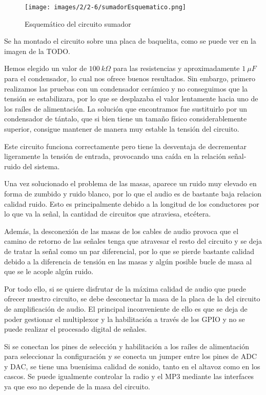 \begin{figure}[h]
    \centering
    \texttt{[image: images/2/2-6/sumadorEsquematico.png]}
    \caption{Esquemático del circuito sumador}
    \label{fig:2-6-sumador}
\end{figure}

Se ha montado el circuito sobre una placa de baquelita, como se puede ver en la imagen de la TODO.\ 


Hemos elegido un valor de $100\ k\Omega$ para las resistencias y aproximadamente $1\ \mu F$ para el condensador, lo cual nos ofrece buenos resultados. Sin embargo, primero realizamos las pruebas con un condensador cerámico y no conseguimos que la tensión se estabilizara, por lo que se desplazaba el valor lentamente hacia uno de los raíles de alimentación. La solución que encontramos fue sustituirlo por un condensador de tántalo, que si bien tiene un tamaño físico considerablemente superior, consigue mantener de manera muy estable la tensión del circuito.

Este circuito funciona correctamente pero tiene la desventaja de decrementar ligeramente la tensión de entrada, provocando una caída en la relación señal-ruido del sistema.

Una vez solucionado el problema de las masas, aparece un ruido muy elevado en forma de zumbido y ruido blanco, por lo que el audio es de bastante baja relacion calidad ruido. Esto es principalmente debido a la longitud de los conductores por lo que va la señal, la cantidad de circuitos que atraviesa, etcétera. 

Además, la desconexión de las masas de los cables de audio provoca que el camino de retorno de las señales tenga que atravesar el resto del circuito y se deja de tratar la señal como un par diferencial, por lo que se pierde bastante calidad debido a la diferencia de tensión en las masas y algún posible bucle de masa al que se le acople algún ruido.

Por todo ello, si se quiere disfrutar de la máxima calidad de audio que puede ofrecer nuestro circuito, se debe desconectar la masa de la placa de la del circuito de amplificación de audio. El principal inconveniente de ello es que se deja de poder gestionar el multiplexor y la habilitación a través de los GPIO y no se puede realizar el procesado digital de señales.

Si se conectan los pines de selección y habilitación a los raíles de alimentación para seleccionar la configuración y se conecta un jumper entre los pines de ADC y DAC, se tiene una buenísima calidad de sonido, tanto en el altavoz como en los cascos. Se puede igualmente controlar la radio y el MP3 mediante las interfaces ya que eso no depende de la masa del circuito.

